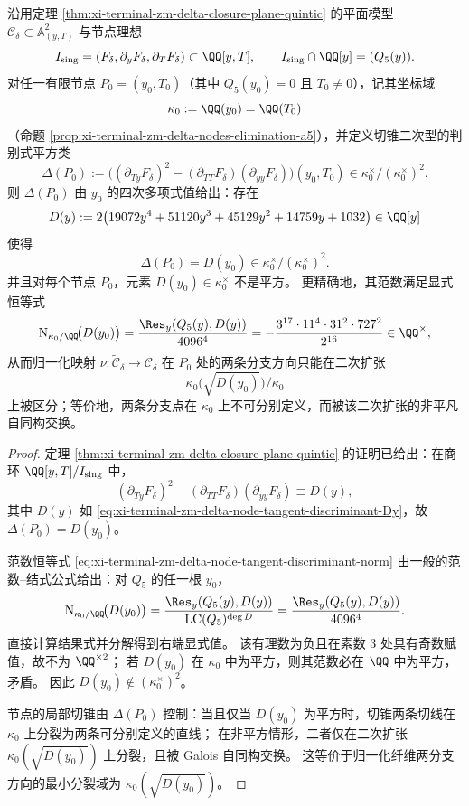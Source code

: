 \begin{proposition}[节点切锥判别式的范数非平方与分裂方向的二次不可平凡性]\label{prop:xi-terminal-zm-delta-node-tangent-discriminant-norm-nonsquare}
沿用定理 \ref{thm:xi-terminal-zm-delta-closure-plane-quintic} 的平面模型 \(\mathcal C_\delta\subset\mathbb A^2_{(y,T)}\) 与节点理想
\[
I_{\mathrm{sing}}=(F_\delta,\partial_yF_\delta,\partial_TF_\delta)\subset\QQ[y,T],
\qquad
I_{\mathrm{sing}}\cap\QQ[y]=(Q_5(y)).
\]
对任一有限节点 \(P_0=(y_0,T_0)\)（其中 \(Q_5(y_0)=0\) 且 \(T_0\neq 0\)），记其坐标域
\[
\kappa_0:=\QQ(y_0)=\QQ(T_0)
\]
（命题 \ref{prop:xi-terminal-zm-delta-nodes-elimination-a5}），并定义切锥二次型的判别式平方类
\[
\Delta(P_0):=\bigl((\partial_{Ty}F_\delta)^2-(\partial_{TT}F_\delta)(\partial_{yy}F_\delta)\bigr)(y_0,T_0)\in \kappa_0^\times/(\kappa_0^\times)^2.
\]
则 \(\Delta(P_0)\) 由 \(y_0\) 的四次多项式值给出：存在
\begin{equation}\label{eq:xi-terminal-zm-delta-node-tangent-discriminant-Dy}
D(y):=2\bigl(19072y^4+51120y^3+45129y^2+14759y+1032\bigr)\in\QQ[y]
\end{equation}
使得
\[
\Delta(P_0)=D(y_0)\in\kappa_0^\times/(\kappa_0^\times)^2.
\]
并且对每个节点 \(P_0\)，元素 \(D(y_0)\in\kappa_0^\times\) 不是平方。
更精确地，其范数满足显式恒等式
\begin{equation}\label{eq:xi-terminal-zm-delta-node-tangent-discriminant-norm}
\mathrm N_{\kappa_0/\QQ}\!\bigl(D(y_0)\bigr)
=\frac{\Res_y(Q_5(y),D(y))}{4096^4}
=-\frac{3^{17}\cdot 11^{4}\cdot 31^{2}\cdot 727^{2}}{2^{16}}\in\QQ^\times,
\end{equation}
从而归一化映射 \(\nu:\widetilde{\mathcal C}_\delta\to\mathcal C_\delta\) 在 \(P_0\) 处的两条分支方向只能在二次扩张
\[
\kappa_0\bigl(\sqrt{D(y_0)}\bigr)/\kappa_0
\]
上被区分；等价地，两条分支点在 \(\kappa_0\) 上不可分别定义，而被该二次扩张的非平凡自同构交换。
\end{proposition}
\begin{proof}
定理 \ref{thm:xi-terminal-zm-delta-closure-plane-quintic} 的证明已给出：在商环 \(\QQ[y,T]/I_{\mathrm{sing}}\) 中，
\[
(\partial_{Ty}F_\delta)^2-(\partial_{TT}F_\delta)(\partial_{yy}F_\delta)\equiv D(y),
\]
其中 \(D(y)\) 如 \eqref{eq:xi-terminal-zm-delta-node-tangent-discriminant-Dy}，故 \(\Delta(P_0)=D(y_0)\)。
\par
范数恒等式 \eqref{eq:xi-terminal-zm-delta-node-tangent-discriminant-norm} 由一般的范数--结式公式给出：对 \(Q_5\) 的任一根 \(y_0\)，
\[
\mathrm N_{\kappa_0/\QQ}\!\bigl(D(y_0)\bigr)=\frac{\Res_y(Q_5(y),D(y))}{\mathrm{LC}(Q_5)^{\deg D}}
=\frac{\Res_y(Q_5(y),D(y))}{4096^4}.
\]
直接计算结果式并分解得到右端显式值。
该有理数为负且在素数 \(3\) 处具有奇数赋值，故不为 \(\QQ^{\times 2}\)；
若 \(D(y_0)\) 在 \(\kappa_0\) 中为平方，则其范数必在 \(\QQ\) 中为平方，矛盾。
因此 \(D(y_0)\notin(\kappa_0^\times)^2\)。
\par
节点的局部切锥由 \(\Delta(P_0)\) 控制：当且仅当 \(D(y_0)\) 为平方时，切锥两条切线在 \(\kappa_0\) 上分裂为两条可分别定义的直线；
在非平方情形，二者仅在二次扩张 \(\kappa_0(\sqrt{D(y_0)})\) 上分裂，且被 Galois 自同构交换。
这等价于归一化纤维两分支方向的最小分裂域为 \(\kappa_0(\sqrt{D(y_0)})\)。
\end{proof}

